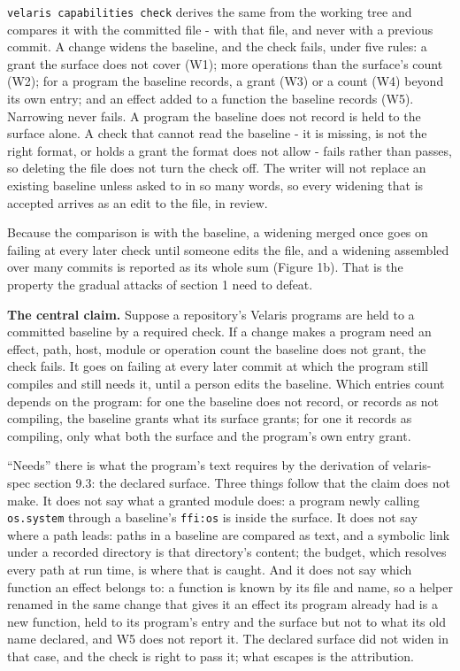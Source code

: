 \documentclass[
]{article}
\begin{document}
\texttt{velaris\ capabilities\ check} derives the same from the working
tree and compares it with the committed file - with that file, and never
with a previous commit. A change widens the baseline, and the check
fails, under five rules: a grant the surface does not cover (W1); more
operations than the surface's count (W2); for a program the baseline
records, a grant (W3) or a count (W4) beyond its own entry; and an
effect added to a function the baseline records (W5). Narrowing never
fails. A program the baseline does not record is held to the surface
alone. A check that cannot read the baseline - it is missing, is not the
right format, or holds a grant the format does not allow - fails rather
than passes, so deleting the file does not turn the check off. The
writer will not replace an existing baseline unless asked to in so many
words, so every widening that is accepted arrives as an edit to the
file, in review.

Because the comparison is with the baseline, a widening merged once goes
on failing at every later check until someone edits the file, and a
widening assembled over many commits is reported as its whole sum
(Figure 1b). That is the property the gradual attacks of section 1 need
to defeat.

\textbf{The central claim.} Suppose a repository's Velaris programs are
held to a committed baseline by a required check. If a change makes a
program need an effect, path, host, module or operation count the
baseline does not grant, the check fails. It goes on failing at every
later commit at which the program still compiles and still needs it,
until a person edits the baseline. Which entries count depends on the
program: for one the baseline does not record, or records as not
compiling, the baseline grants what its surface grants; for one it
records as compiling, only what both the surface and the program's own
entry grant.

``Needs'' there is what the program's text requires by the derivation of
velaris-spec section 9.3: the declared surface. Three things follow that
the claim does not make. It does not say what a granted module does: a
program newly calling \texttt{os.system} through a baseline's
\texttt{ffi:os} is inside the surface. It does not say where a path
leads: paths in a baseline are compared as text, and a symbolic link
under a recorded directory is that directory's content; the budget,
which resolves every path at run time, is where that is caught. And it
does not say which function an effect belongs to: a function is known by
its file and name, so a helper renamed in the same change that gives it
an effect its program already had is a new function, held to its
program's entry and the surface but not to what its old name declared,
and W5 does not report it. The declared surface did not widen in that
case, and the check is right to pass it; what escapes is the
attribution.
\end{document}
